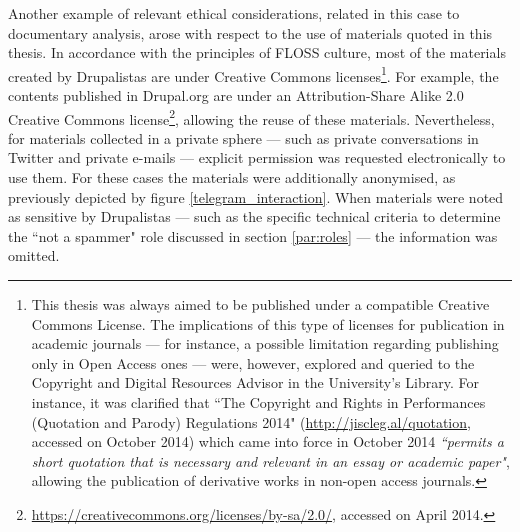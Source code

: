 Another example of relevant ethical considerations, related in this case to documentary analysis, arose with respect to the use of materials quoted in this thesis. In accordance with the principles of FLOSS culture, most of the materials created by Drupalistas are under Creative Commons licenses\footnote{This thesis was always aimed to be published under a compatible Creative Commons License. The implications of this type of licenses for publication in academic journals --- for instance, a possible limitation regarding publishing only in Open Access ones --- were, however, explored and queried to the Copyright and Digital Resources Advisor in the University's Library. For instance, it was clarified that ``The Copyright and Rights in Performances (Quotation and Parody) Regulations 2014" (\url{http://jiscleg.al/quotation}, accessed on  October 2014) which came into force in October 2014 \emph{``permits a short quotation that is necessary and relevant in an essay or academic paper"}, allowing the publication of derivative works in non-open access journals.}. For example, the contents published in Drupal.org are under an Attribution-Share Alike 2.0 Creative Commons license\footnote{\url{https://creativecommons.org/licenses/by-sa/2.0/}, accessed on  April 2014.}, allowing the reuse of these materials. Nevertheless, for materials collected in a private sphere --- such as private conversations in Twitter and private e-mails --- explicit permission was requested electronically to use them. For these cases the materials were additionally anonymised, as previously depicted by figure \ref{telegram_interaction}. When materials were noted as sensitive by Drupalistas --- such as the specific technical criteria to determine the ``not a spammer" role discussed in section \ref{par:roles} --- the information was omitted.

